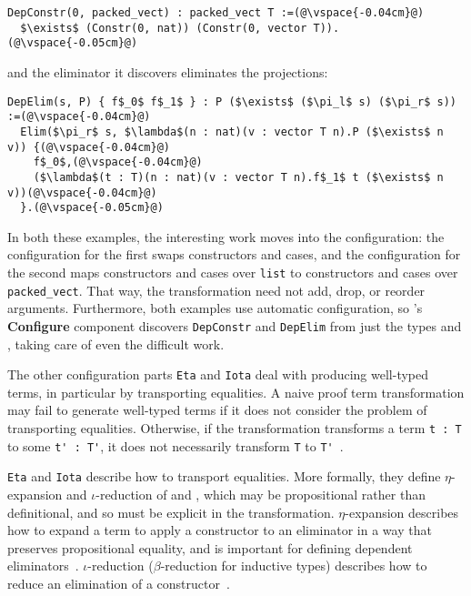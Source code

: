 \begin{lstlisting}
DepConstr(0, packed_vect) : packed_vect T :=(@\vspace{-0.04cm}@)
  $\exists$ (Constr(0, nat)) (Constr(0, vector T)).(@\vspace{-0.05cm}@)
\end{lstlisting}
and the eliminator it discovers eliminates the projections:

\begin{lstlisting}
DepElim(s, P) { f$_0$ f$_1$ } : P ($\exists$ ($\pi_l$ s) ($\pi_r$ s)) :=(@\vspace{-0.04cm}@)
  Elim($\pi_r$ s, $\lambda$(n : nat)(v : vector T n).P ($\exists$ n v)) {(@\vspace{-0.04cm}@)
    f$_0$,(@\vspace{-0.04cm}@)
    ($\lambda$(t : T)(n : nat)(v : vector T n).f$_1$ t ($\exists$ n v))(@\vspace{-0.04cm}@)
  }.(@\vspace{-0.05cm}@) 
\end{lstlisting}

In both these examples, the interesting work moves into the configuration:
the configuration for the first swaps constructors and cases,
and the configuration for the second maps constructors and cases over \lstinline{list} to constructors and cases over \lstinline{packed_vect}. %
That way, the transformation need not add, drop, or reorder arguments.
Furthermore, both examples use automatic configuration, so \toolname's \textbf{Configure} component 
discovers \lstinline{DepConstr} and \lstinline{DepElim} from just the types \A and \B, taking care of even the difficult work.

The other configuration parts \lstinline{Eta} and \lstinline{Iota} deal with producing well-typed terms,
in particular by transporting equalities.
A naive proof term transformation
may fail to generate well-typed terms if it does not consider the problem of transporting equalities.
Otherwise, if the transformation transforms a term \lstinline{t : T} to some \lstinline{t' : T'}, it does not necessarily
transform \lstinline{T} to \lstinline{T'}~\cite{tabareau2019marriage}.

\lstinline{Eta} and \lstinline{Iota} describe how to transport equalities.
More formally, they define $\eta$-expansion and $\iota$-reduction of \A and \B,
which may be propositional rather than definitional, and so must be explicit in the transformation.
$\eta$-expansion describes how to expand a term to apply a constructor to an eliminator in a way that preserves propositional equality,
and is important for defining dependent eliminators~\cite{nlab:eta-conversion}.
$\iota$-reduction ($\beta$-reduction for inductive types) describes how to reduce an elimination of a constructor~\cite{nlab:beta-reduction}.

